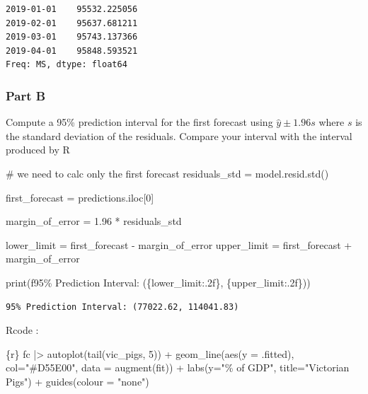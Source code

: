 \documentclass[
  11pt,
]{article}
\newenvironment{Shaded}{\begin{snugshade}}{\end{snugshade}}
\newcommand{\BuiltInTok}[1]{\textcolor[rgb]{0.00,0.23,0.31}{#1}}
\newcommand{\CommentTok}[1]{\textcolor[rgb]{0.37,0.37,0.37}{#1}}
\newcommand{\DecValTok}[1]{\textcolor[rgb]{0.68,0.00,0.00}{#1}}
\newcommand{\FloatTok}[1]{\textcolor[rgb]{0.68,0.00,0.00}{#1}}
\newcommand{\NormalTok}[1]{\textcolor[rgb]{0.00,0.23,0.31}{#1}}
\newcommand{\OperatorTok}[1]{\textcolor[rgb]{0.37,0.37,0.37}{#1}}
\newcommand{\SpecialCharTok}[1]{\textcolor[rgb]{0.37,0.37,0.37}{#1}}
\newcommand{\SpecialStringTok}[1]{\textcolor[rgb]{0.13,0.47,0.30}{#1}}
\begin{document}
\begin{verbatim}
2019-01-01    95532.225056
2019-02-01    95637.681211
2019-03-01    95743.137366
2019-04-01    95848.593521
Freq: MS, dtype: float64
\end{verbatim}

\subsubsection{Part B}\label{part-b}

Compute a 95\% prediction interval for the first forecast using
\(\hat{y}±1.96s\) where \(s\) is the standard deviation of the
residuals. Compare your interval with the interval produced by R

\begin{Shaded}
\begin{Highlighting}[]
\CommentTok{\# we need to calc only the first forecast }
\NormalTok{residuals\_std }\OperatorTok{=}\NormalTok{ model.resid.std()}

\NormalTok{first\_forecast }\OperatorTok{=}\NormalTok{ predictions.iloc[}\DecValTok{0}\NormalTok{]}

\NormalTok{margin\_of\_error }\OperatorTok{=} \FloatTok{1.96} \OperatorTok{*}\NormalTok{ residuals\_std}

\NormalTok{lower\_limit }\OperatorTok{=}\NormalTok{ first\_forecast }\OperatorTok{{-}}\NormalTok{ margin\_of\_error}
\NormalTok{upper\_limit }\OperatorTok{=}\NormalTok{ first\_forecast }\OperatorTok{+}\NormalTok{ margin\_of\_error}

\BuiltInTok{print}\NormalTok{(}\SpecialStringTok{f\textquotesingle{}95\% Prediction Interval: (}\SpecialCharTok{\{}\NormalTok{lower\_limit}\SpecialCharTok{:.2f\}}\SpecialStringTok{, }\SpecialCharTok{\{}\NormalTok{upper\_limit}\SpecialCharTok{:.2f\}}\SpecialStringTok{)\textquotesingle{}}\NormalTok{)}
\end{Highlighting}
\end{Shaded}

\begin{verbatim}
95% Prediction Interval: (77022.62, 114041.83)
\end{verbatim}

Rcode :

\begin{Shaded}
\begin{Highlighting}[]

\NormalTok{\textasciigrave{}\textasciigrave{}\textasciigrave{}\{r\}}
\NormalTok{fc |\textgreater{}}
\NormalTok{  autoplot(tail(vic\_pigs, 5)) +}
\NormalTok{  geom\_line(aes(y = .fitted), col="\#D55E00",}
\NormalTok{            data = augment(fit)) +}
\NormalTok{  labs(y="\% of GDP", title="Victorian Pigs") +}
\NormalTok{  guides(colour = "none")}
\end{Highlighting}
\end{Shaded}
\end{document}
